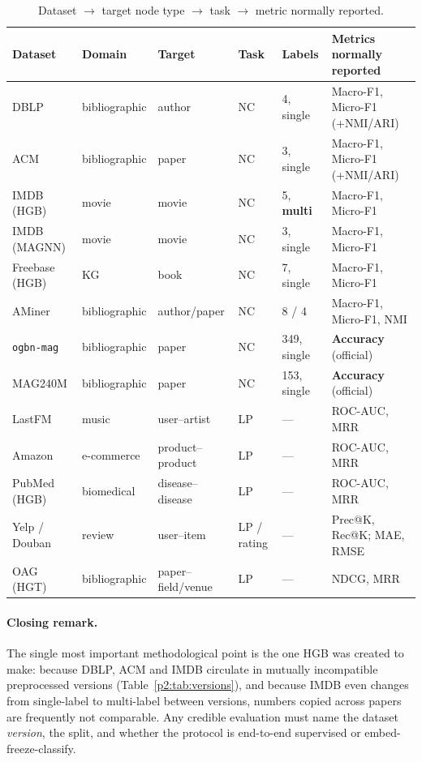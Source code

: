 \begin{table}[htbp]
\centering
\small
\caption{Dataset $\to$ target node type $\to$ task $\to$ metric normally reported.}
\label{p2:tab:summary}
\footnotesize
\setlength{\tabcolsep}{4pt}
\begin{tabular}{@{}llllll@{}}
\toprule
Dataset & Domain & Target & Task & Labels & Metrics normally reported \\
\midrule
DBLP      & bibliographic & author  & NC     & 4, single & Macro-F1, Micro-F1 (+NMI/ARI) \\
ACM       & bibliographic & paper   & NC     & 3, single & Macro-F1, Micro-F1 (+NMI/ARI) \\
IMDB (HGB)& movie         & movie   & NC     & 5, \textbf{multi} & Macro-F1, Micro-F1 \\
IMDB (MAGNN)& movie       & movie   & NC     & 3, single & Macro-F1, Micro-F1 \\
Freebase (HGB) & KG       & book    & NC     & 7, single & Macro-F1, Micro-F1 \\
AMiner    & bibliographic & author/paper & NC & 8 / 4    & Macro-F1, Micro-F1, NMI \\
\texttt{ogbn-mag} & bibliographic & paper & NC & 349, single & \textbf{Accuracy} (official) \\
MAG240M   & bibliographic & paper   & NC     & 153, single & \textbf{Accuracy} (official) \\
\midrule
LastFM    & music         & user--artist & LP & ---      & ROC-AUC, MRR \\
Amazon    & e-commerce    & product--product & LP & ---  & ROC-AUC, MRR \\
PubMed (HGB) & biomedical & disease--disease & LP & ---  & ROC-AUC, MRR \\
Yelp / Douban & review    & user--item & LP / rating & --- & Prec@K, Rec@K; MAE, RMSE \\
OAG (HGT) & bibliographic & paper--field/venue & LP & --- & NDCG, MRR \\
\bottomrule
\end{tabular}
\end{table}

\paragraph{Closing remark.} The single most important methodological point is the one HGB was
created to make: because DBLP, ACM and IMDB circulate in mutually incompatible preprocessed
versions (Table~\ref{p2:tab:versions}), and because IMDB even changes from single-label to
multi-label between versions, numbers copied across papers are frequently not comparable. Any
credible evaluation must name the dataset \emph{version}, the split, and whether the protocol is
end-to-end supervised or embed-freeze-classify.
